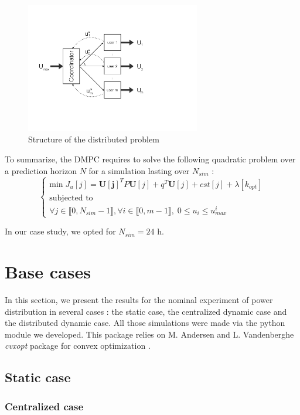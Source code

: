 \documentclass[conference]{IEEEtran}
\begin{document}
\begin{figure}[!t]
\centering
\includegraphics[width=3in]{ASHschema}
\caption{Structure of the distributed problem}
\label{coord}
\end{figure}
To summarize, the DMPC requires to solve the following quadratic problem over a prediction horizon $N$ for a simulation lasting over $N_{sim}$ :
\begin{equation}
\left\{
\begin{array}{l}
\text{min} \; J_u[j] =   \bm{U[j]}^T P \bm{U}[j] + q^T \bm{U}[j] + cst[j] + \lambda[k_{opt}]  \\
\text{subjected to}\\
\forall j  \in \llbracket 0, N_{sim}-1 \rrbracket, \forall i \in \llbracket 0, m -1 \rrbracket, \; 0 \leq  u_i \leq  u_{max}^i
\end{array}
\right.
\label{QP}
\end{equation}

In our case study, we opted for $N_{sim} = 24$ h.  

\section{Base cases}
In this section, we present the results for the nominal experiment of power distribution in several cases : the static case, the centralized dynamic case and the distributed dynamic case. All those simulations were made via the python module we developed. This package relies on M. Andersen and L. Vandenberghe \textit{cvxopt} package for convex optimization \cite{Boyd}.

\subsection{Static case}
\subsubsection{Centralized case}
\end{document}
